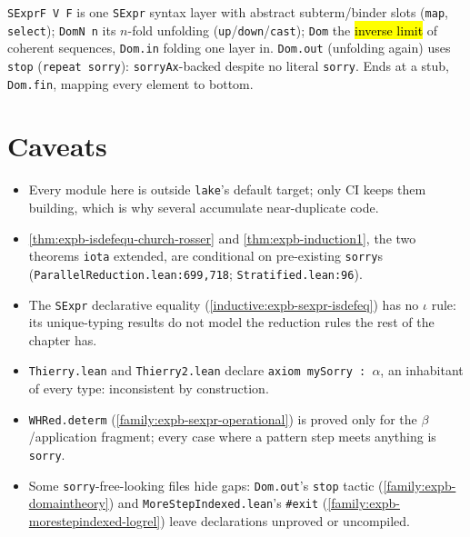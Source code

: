\begin{definition}
\label{family:expb-domaintheory}
\leanok
{}

 \texttt{SExprF V F} is one \texttt{SExpr} syntax layer with abstract subterm/binder
slots (\texttt{map}, \texttt{select}); \texttt{DomN n} its $n$-fold unfolding
(\texttt{up}/\texttt{down}/\texttt{cast}); \texttt{Dom} the \hl{inverse limit} of coherent
sequences, \texttt{Dom.in} folding one layer in.
 \texttt{Dom.out} (unfolding again) uses \texttt{stop} (\texttt{repeat sorry}):
\texttt{sorryAx}-backed despite no literal \texttt{sorry}. Ends at a stub, \texttt{Dom.fin}, mapping
every element to bottom.
\end{definition}

\section*{Caveats}

\begin{itemize}
\item Every module here is outside \texttt{lake}'s default target; only CI keeps them building,
which is why several accumulate near-duplicate code.
\item \ref{thm:expb-isdefequ-church-rosser} and \ref{thm:expb-induction1}, the two theorems
\texttt{iota} extended, are conditional on pre-existing \texttt{sorry}s
(\texttt{ParallelReduction.lean:699,718}; \texttt{Stratified.lean:96}).
\item The \texttt{SExpr} declarative equality (\ref{inductive:expb-sexpr-isdefeq}) has no $\iota$
rule: its unique-typing results do not model the reduction rules the rest of the chapter has.
\item \texttt{Thierry.lean} and \texttt{Thierry2.lean} declare \texttt{axiom mySorry : $\alpha$}, an
inhabitant of every type: inconsistent by construction.
\item \texttt{WHRed.determ} (\ref{family:expb-sexpr-operational}) is proved only for the
$\beta$/application fragment; every case where a pattern step meets anything is \texttt{sorry}.
\item Some \texttt{sorry}-free-looking files hide gaps: \texttt{Dom.out}'s \texttt{stop} tactic
(\ref{family:expb-domaintheory}) and \texttt{MoreStepIndexed.lean}'s \texttt{\#exit}
(\ref{family:expb-morestepindexed-logrel}) leave declarations unproved or uncompiled.
\end{itemize}
